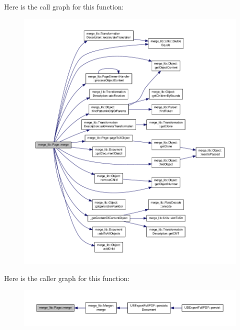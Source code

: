 Here is the call graph for this function\-:
\nopagebreak
\begin{figure}[H]
\begin{center}
\leavevmode
\includegraphics[width=350pt]{db/d32/classmerge__lib_1_1_page_ab743f0a5867701d8be79af076f02a6fd_cgraph}
\end{center}
\end{figure}




Here is the caller graph for this function\-:
\nopagebreak
\begin{figure}[H]
\begin{center}
\leavevmode
\includegraphics[width=350pt]{db/d32/classmerge__lib_1_1_page_ab743f0a5867701d8be79af076f02a6fd_icgraph}
\end{center}
\end{figure}


